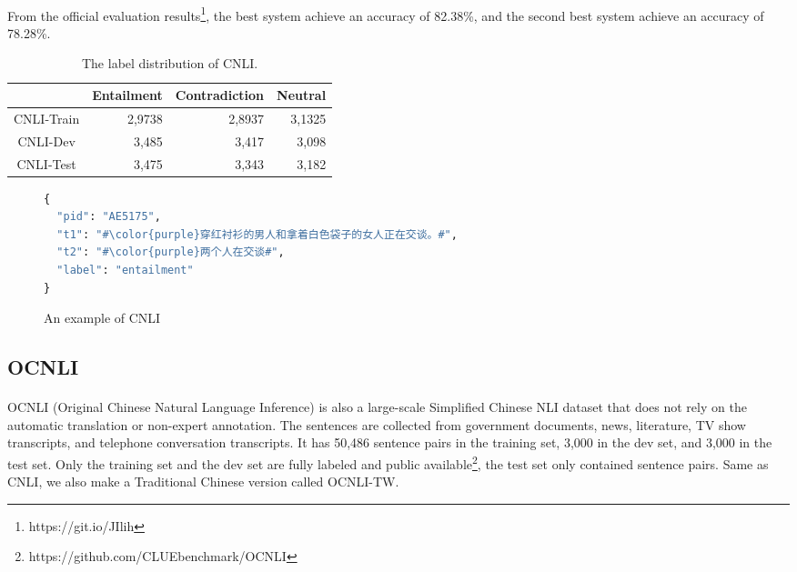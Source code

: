 \documentclass{article}
\begin{document}
\begin{CJK*}{UTF8}{bkai}
\paragraph{}
From the official evaluation results\footnote{https://git.io/JIlih}, the best system achieve an accuracy of 82.38\%, and the second best system achieve an accuracy of 78.28\%.

\begin{table}[ht!]
  \centering
  \begin{tabular}{|c|r|r|r|}
  \hline
             & Entailment & Contradiction & Neutral \\ \hline
  CNLI-Train & 2,9738     & 2,8937        & 3,1325  \\ \hline
  CNLI-Dev   & 3,485      & 3,417         & 3,098   \\ \hline
  CNLI-Test  & 3,475      & 3,343         & 3,182   \\ \hline
  \end{tabular}
  \caption{The label distribution of CNLI.}

\end{table}
\begin{figure}
\caption{An example of CNLI}
\begin{CJK*}{UTF8}{gbsn}
\begin{lstlisting}[language=Python, escapechar=\#]
{
  "pid": "AE5175",
  "t1": "#\color{purple}穿红衬衫的男人和拿着白色袋子的女人正在交谈。#",
  "t2": "#\color{purple}两个人在交谈#",
  "label": "entailment"
}
\end{lstlisting}
\end{CJK*}
\end{figure}

\subsection{OCNLI}
\paragraph{}
OCNLI (Original Chinese Natural Language Inference) is also a large-scale Simplified Chinese NLI dataset that does not rely on the automatic translation or non-expert annotation. The sentences are collected from government documents, news, literature, TV show transcripts, and telephone conversation transcripts. It has 50,486 sentence pairs in the training set, 3,000 in the dev set, and 3,000 in the test set. Only the training set and the dev set are fully labeled and public available\footnote{https://github.com/CLUEbenchmark/OCNLI}, the test set only contained sentence pairs. Same as CNLI, we also make a Traditional Chinese version called OCNLI-TW.


\end{CJK*}
\end{document}
